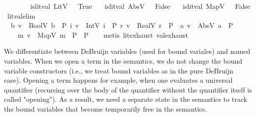\begin{isabellebody}
\ \ \ \isanewline
\ \ \ \ {\isachardoublequoteopen}is{\isacharunderscore}{\kern0pt}lit{\isacharunderscore}{\kern0pt}val\ {\isacharparenleft}{\kern0pt}LitV\ {\isacharunderscore}{\kern0pt}{\isacharparenright}{\kern0pt}\ {\isacharequal}{\kern0pt}\ True{\isachardoublequoteclose}\isanewline
\ \ {\isacharbar}{\kern0pt}\ {\isachardoublequoteopen}is{\isacharunderscore}{\kern0pt}lit{\isacharunderscore}{\kern0pt}val\ {\isacharparenleft}{\kern0pt}AbsV\ {\isacharunderscore}{\kern0pt}{\isacharparenright}{\kern0pt}\ {\isacharequal}{\kern0pt}\ False{\isachardoublequoteclose}\isanewline
\ \ {\isacharbar}{\kern0pt}\ {\isachardoublequoteopen}is{\isacharunderscore}{\kern0pt}lit{\isacharunderscore}{\kern0pt}val\ {\isacharparenleft}{\kern0pt}MapV\ {\isacharunderscore}{\kern0pt}{\isacharparenright}{\kern0pt}\ {\isacharequal}{\kern0pt}\ False{\isachardoublequoteclose}\isanewline
\isanewline
{}\isamarkupfalse%
\ lit{\isacharunderscore}{\kern0pt}val{\isacharunderscore}{\kern0pt}elim{\isacharcolon}{\kern0pt}\isanewline
\ {\isachardoublequoteopen}{\isasymlbrakk}\ {\isasymAnd}b{\isachardot}{\kern0pt}\ v\ {\isacharequal}{\kern0pt}\ BoolV\ b\ {\isasymLongrightarrow}\ P{\isacharsemicolon}{\kern0pt}\ {\isasymAnd}i{\isachardot}{\kern0pt}\ v\ {\isacharequal}{\kern0pt}\ IntV\ i\ {\isasymLongrightarrow}\ P{\isacharsemicolon}{\kern0pt}\ {\isasymAnd}r{\isachardot}{\kern0pt}\ v\ {\isacharequal}{\kern0pt}\ RealV\ r\ {\isasymLongrightarrow}\ P{\isacharsemicolon}{\kern0pt}\ {\isasymAnd}\ a{\isachardot}{\kern0pt}\ v\ {\isacharequal}{\kern0pt}\ AbsV\ a\ {\isasymLongrightarrow}\ P{\isacharsemicolon}{\kern0pt}\isanewline
\ \ \ \ {\isasymAnd}m{\isachardot}{\kern0pt}\ v\ {\isacharequal}{\kern0pt}\ MapV\ m\ {\isasymLongrightarrow}\ P{\isasymrbrakk}\ {\isasymLongrightarrow}\ P{\isachardoublequoteclose}\isanewline
%
\isadelimproof
\ \ %
\endisadelimproof
%
\isatagproof
{}\isamarkupfalse%
\ {\isacharparenleft}{\kern0pt}metis\ lit{\isachardot}{\kern0pt}exhaust\ val{\isachardot}{\kern0pt}exhaust{\isacharparenright}{\kern0pt}%
\endisatagproof
{\isafoldproof}%
%
\isadelimproof
%
\endisadelimproof
%
\begin{isamarkuptext}%
We differentiate between DeBruijn variables (used for bound variales) and named variables. When we open 
a term in the semantics, we do not change the bound variable constructors (i.e., we treat bound 
variables as in the pure DeBruijn case). Opening a term happens for example, when one evaluates a
universal quantifier (recursing over the body of the quantifier without the quantifier itself is
called "opening"). As a result, we need a separate state in the semantics to track the bound variables 
that become temporarily free in the semantics.


\end{isamarkuptext}
\end{isabellebody}
